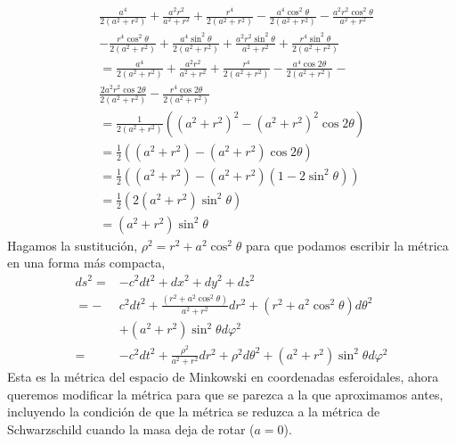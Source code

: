 \begin{equation}
    \begin{aligned}
         & \frac{a^4}{2\left(a^2+r^2\right)}+\frac{a^2 r^2}{a^2+r^2}+\frac{r^4}{2\left(a^2+r^2\right)}-\frac{a^4 \cos ^2 \theta}{2\left(a^2+r^2\right)}-\frac{a^2 r^2 \cos ^2 \theta}{a^2+r^2}        \\
         & -\frac{r^4 \cos ^2 \theta}{2\left(a^2+r^2\right)}+\frac{a^4 \sin ^2 \theta}{2\left(a^2+r^2\right)}+\frac{a^2 r^2 \sin ^2 \theta}{a^2+r^2}+\frac{r^4 \sin ^2 \theta}{2\left(a^2+r^2\right)} \\
         & =\frac{a^4}{2\left(a^2+r^2\right)}+\frac{a^2 r^2}{a^2+r^2}+\frac{r^4}{2\left(a^2+r^2\right)}-\frac{a^4 \cos 2 \theta}{2\left(a^2+r^2\right)}-                                              \\
         & \frac{2 a^2 r^2 \cos 2 \theta}{2\left(a^2+r^2\right)}-\frac{r^4 \cos 2 \theta}{2\left(a^2+r^2\right)}                                                                                      \\
         & =\frac{1}{2\left(a^2+r^2\right)}\left(\left(a^2+r^2\right)^2-\left(a^2+r^2\right)^2 \cos 2 \theta\right)                                                                                   \\
         & =\frac{1}{2}\left(\left(a^2+r^2\right)-\left(a^2+r^2\right) \cos 2 \theta\right)                                                                                                           \\
         & =\frac{1}{2}\left(\left(a^2+r^2\right)-\left(a^2+r^2\right)\left(1-2 \sin ^2 \theta\right)\right)                                                                                          \\
         & =\frac{1}{2}\left(2\left(a^2+r^2\right) \sin ^2 \theta\right)                                                                                                                              \\
         & =\left(a^2+r^2\right) \sin ^2 \theta
    \end{aligned}
\end{equation}
Hagamos la sustitución, $\rho^2=r^2+a^2 \cos ^2 \theta$ para que podamos escribir la métrica en una forma más compacta,
\begin{align}
    d s^2= & -c^2 d t^2+d x^2+d y^2+d z^2                                                                                       \\
    =-     & c^2 d t^2+\frac{\left(r^2+a^2 \cos ^2 \theta\right)}{a^2+r^2} d r^2+\left(r^2+a^2 \cos ^2 \theta\right) d \theta^2 \\
           & +\left(a^2+r^2\right) \sin ^2 \theta d \varphi^2                                                                   \\
    =      & -c^2 d t^2+\frac{\rho^2}{a^2+r^2} d r^2+\rho^2 d \theta^2+\left(a^2+r^2\right) \sin ^2 \theta d \varphi^2
\end{align}
Esta es la métrica del espacio de Minkowski en coordenadas esferoidales, ahora queremos modificar la métrica para que se parezca a la que aproximamos antes, incluyendo la condición de que la métrica se reduzca a la métrica de Schwarzschild cuando la masa deja de rotar ($a = 0$).

